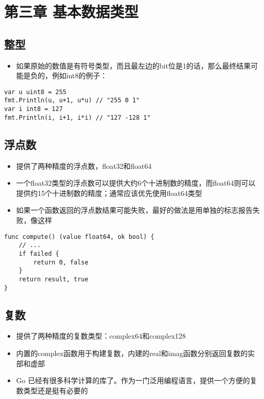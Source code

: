 \hypertarget{ux7b2cux4e09ux7ae0-ux57faux672cux6570ux636eux7c7bux578b}{%
\section{第三章
基本数据类型}\label{ux7b2cux4e09ux7ae0-ux57faux672cux6570ux636eux7c7bux578b}}

\hypertarget{ux6574ux578b}{%
\subsection{整型}\label{ux6574ux578b}}

\begin{itemize}
\tightlist
\item
  如果原始的数值是有符号类型，而且最左边的bit位是1的话，那么最终结果可能是负的，例如int8的例子：
\end{itemize}

\begin{verbatim}
var u uint8 = 255
fmt.Println(u, u+1, u*u) // "255 0 1"
var i int8 = 127
fmt.Println(i, i+1, i*i) // "127 -128 1"
\end{verbatim}

\hypertarget{ux6d6eux70b9ux6570}{%
\subsection{浮点数}\label{ux6d6eux70b9ux6570}}

\begin{itemize}
\tightlist
\item
  提供了两种精度的浮点数，float32和float64
\item
  一个float32类型的浮点数可以提供大约6个十进制数的精度，而float64则可以提供约15个十进制数的精度；通常应该优先使用float64类型
\item
  如果一个函数返回的浮点数结果可能失败，最好的做法是用单独的标志报告失败，像这样
\end{itemize}

\begin{verbatim}
func compute() (value float64, ok bool) {
    // ...
    if failed {
        return 0, false
    }
    return result, true
}
\end{verbatim}

\hypertarget{ux590dux6570}{%
\subsection{复数}\label{ux590dux6570}}

\begin{itemize}
\tightlist
\item
  提供了两种精度的复数类型：complex64和complex128
\item
  内置的complex函数用于构建复数，内建的real和imag函数分别返回复数的实部和虚部
\item
  Go
  已经有很多科学计算的库了。作为一门泛用编程语言，提供一个方便的复数类型还是挺有必要的
\end{itemize}

